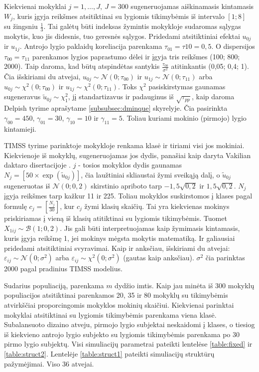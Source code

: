 \documentclass[11pt,a4paper]{article}
\begin{document}
\indent Kiekvienai mokyklai $j =1,\dots,J,\ J=300$ sugeneruojamas aiškinamasis kintamasis $W_j$, kuris įgyja reikšmes atsitiktinai su lygiomis tikimybėmis iš intervalo $[1; 8]$ su žingsniu $\frac{1}{3}$. Tai galėtų būti indeksas žymintis mokykloje sudaromas sąlygas mokytis, kuo jis didesnis, tuo geresnės sąlygos. Pridedami atsitiktiniai efektai $u_{0j}$ ir $u_{1j}$. Antrojo lygio paklaidų koreliacija parenkama $\tau_{01} = \tau{10}=0,5$. O dispersijos $\tau_{00}=\tau_{11}$ parenkamos lygios paprastumo dėlei ir įgyja tris reikšmes (100; 800; 2000). Taip daroma, kad būtų atspindėtas santykis $\frac{\tau_{00}}{\sigma^2}$ atitinkantis (0,05; 0,4; 1). Čia išskiriami du atvejai, $u_{0j}\sim \mathcal{N}(0; \tau_{00})$ ir $u_{1j}\sim \mathcal{N}(0; \tau_{11})$ arba $u_{0j}\sim \chi^2(0; \tau_{00})$ ir $u_{1j}\sim \chi^2(0; \tau_{11})$. Toks $\chi^2$ pasiskirstymas gaunamas sugeneravus $\tilde{u}_{0j}\sim\chi^2_1$, jį standartizavus ir padauginus iš $\sqrt{\tau_{pp}}$, kaip daroma Delpish tyrime aprašytame \ref{subsubsec:dminque} skyrelyje. Čia pasirinkta  $\gamma_{00}=450$, $\gamma_{01}=30$, $\gamma_{10}=10$ ir $\gamma_{11}=5$. Toliau kuriami mokinio (pirmojo) lygio kintamieji.

\indent TIMSS tyrime parinktoje mokykloje renkama klasė ir tiriami visi jos mokiniai. Kiekvienoje iš mokyklų, sugeneruojamas jos dydis, panašiai kaip daryta Vakilian daktaro disertacijoje \cite{mcmc}. $j$ - tosios mokyklos dydis gaunamas $N_j=\left[50\times\exp{(\tilde{u}_{0j})}\right]$, čia laužtiniai skliaustai žymi sveikąją dalį, o $\tilde{u}_{0j}$ sugeneruotas iš $\mathcal{N}(0; 0,2)$ skirstinio apriboto tarp $-1,5 \sqrt{0,2}$ ir $1,5 \sqrt{0,2}$.  $N_j$ įgyja reikšmes tarp kažkur 11 ir 225. Toliau mokyklos suskirstomos į klases pagal formulę $c_j=\left[\frac{N_j}{30}\right]$, kur $c_j$ žymi klasių skaičių. Tai yra kiekvienas mokinys priskiriamas į vieną iš klasių atitiktinai su lygiomis tikimybėmis. Tuomet $X_{1ij}\sim \mathcal{B}(1; 0,2)$. Jis gali būti interpretuojamas kaip žymimasis kintamasis, kuris įgyja reikšmę 1, jei mokinys mėgsta mokytis matematiką. Ir galiausiai pridedami atsitiktiniai svyravimai. Kaip ir anksčiau, išskiriami du atvejai: $\varepsilon_{ij}\sim \mathcal{N}(0; \sigma^2)$ arba $\varepsilon_{ij}\sim \chi^2(0; \sigma^2)$ (gautas kaip anksčiau). $\sigma^2$ čia parinktas 2000 pagal pradinius TIMSS modelius.

\indent Sudarius populiaciją, parenkama $m$ dydžio imtis. Kaip jau minėta iš 300 mokyklų populiacijos atsitiktinai parenkamos 20, 35 ir 80 mokyklų su tikimybėmis atvirkščiai proporcingomis mokyklos mokinių skaičiui. Kiekvienai parinktai mokyklai atsitiktinai su lygiomis tikimybėmis parenkama viena klasė. Subalansuoto dizaino atveju, pirmojo lygio subjektai neskaidomi į klases, o tiesiog iš kiekvieno antrojo lygio subjekto su lygiomis tikimybėmis parenkama po 30 pirmo lygio subjektų. Visi simuliacijų parametrai pateikti lentelėse \ref{table:fixed} ir \ref{table:struct2}. Lentelėje \ref{table:struct1} pateikti simuliacijų struktūrų pažymėjimai. Viso 36 atvejai.
\end{document}
